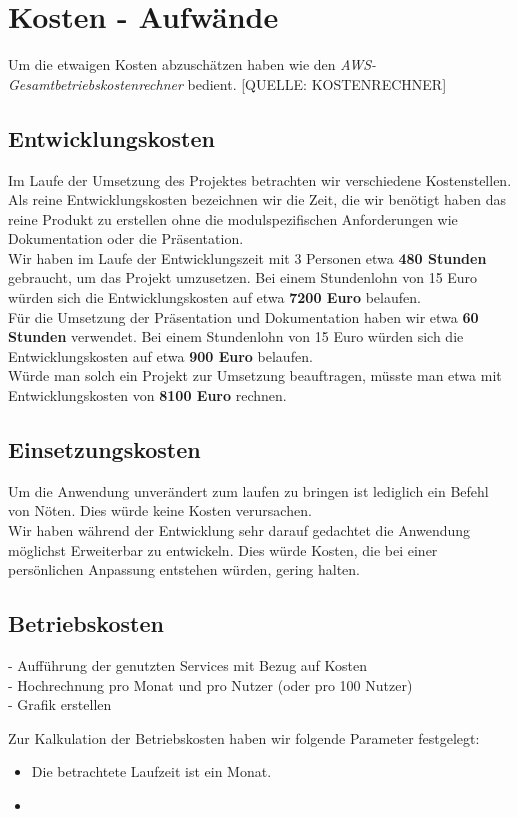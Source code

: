 \documentclass[a4paper, 12pt]{scrreprt}
\renewcommand\_{\textunderscore\allowbreak}
\begin{document}
\chapter{Kosten - Aufwände}
Um die etwaigen Kosten abzuschätzen haben wie den \textit{AWS-Gesamtbetriebskostenrechner} bedient. [QUELLE: KOSTENRECHNER] 
\section{Entwicklungskosten}
Im Laufe der Umsetzung des Projektes betrachten wir verschiedene Kostenstellen. Als reine Entwicklungskosten bezeichnen wir die Zeit, die wir benötigt haben das reine Produkt zu erstellen ohne die modulspezifischen Anforderungen wie Dokumentation oder die Präsentation. \\
Wir haben im Laufe der Entwicklungszeit mit 3 Personen etwa \textbf{480 Stunden} gebraucht, um das Projekt umzusetzen. Bei einem Stundenlohn von 15 Euro würden sich die Entwicklungskosten auf etwa \textbf{7200 Euro} belaufen. \\
Für die Umsetzung der Präsentation und Dokumentation haben wir etwa \textbf{60 Stunden} verwendet. Bei einem Stundenlohn von 15 Euro würden sich die Entwicklungskosten auf etwa \textbf{900 Euro} belaufen. \\
Würde man solch ein Projekt zur Umsetzung beauftragen, müsste man etwa mit Entwicklungskosten von \textbf{8100 Euro} rechnen.
\section{Einsetzungskosten}
Um die Anwendung unverändert zum laufen zu bringen ist lediglich ein Befehl von Nöten. Dies würde keine Kosten verursachen. \\
Wir haben während der Entwicklung sehr darauf gedachtet die Anwendung möglichst Erweiterbar zu entwickeln. Dies würde Kosten, die bei einer persönlichen Anpassung entstehen würden, gering halten.
\section{Betriebskosten}
- Aufführung der genutzten Services mit Bezug auf Kosten\\
- Hochrechnung pro Monat und pro Nutzer (oder pro 100 Nutzer) \\
- Grafik erstellen

Zur Kalkulation der Betriebskosten haben wir folgende Parameter festgelegt:
\begin{itemize}
\item Die betrachtete Laufzeit ist ein Monat.
\item 
\end{itemize}


\clearpage


%
\end{document}
